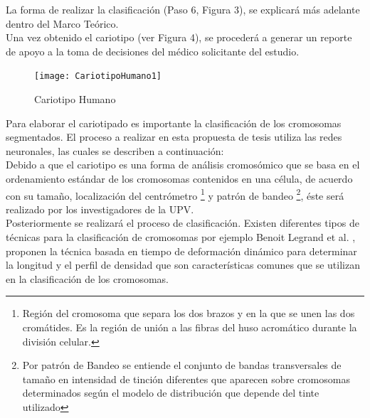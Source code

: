 \documentclass[12pt,letterpaper,titlepage]{article}
\begin{document}
\begin{itemize}
La forma de realizar la clasificación (Paso 6, Figura 3), se explicará más adelante dentro del Marco Teórico.\\


Una vez obtenido el cariotipo (ver Figura 4), se procederá a generar un reporte de apoyo a la toma de decisiones del médico solicitante del estudio.\\

\begin{figure}
  \centering
    \texttt{[image: CariotipoHumano1]}
  \caption{Cariotipo Humano}
  \label{fig5:CariotipoHumano}
\end{figure}


Para elaborar el cariotipado es importante la clasificación de los cromosomas segmentados. El proceso a realizar en esta propuesta de tesis utiliza las redes neuronales, las cuales se describen a continuación:\\

Debido a que el cariotipo es una forma de análisis cromosómico que se basa en el ordenamiento estándar de los cromosomas contenidos en una célula, de acuerdo con su tamaño, localización del centrómetro \footnote{Región del cromosoma que separa los dos brazos y en la que se unen las dos cromátides. Es la región de unión a las fibras del huso acromático durante la división celular.} y patrón de bandeo \footnote{Por patrón de Bandeo se entiende el conjunto de bandas transversales de tamaño en intensidad de tinción diferentes que aparecen sobre cromosomas determinados según el modelo de distribución que depende del tinte utilizado}, éste será realizado por los investigadores de la UPV.\\

Posteriormente se realizará el proceso de clasificación. Existen diferentes tipos de técnicas para la clasificación de cromosomas por ejemplo Benoit Legrand et al. \cite{132}, proponen la técnica basada en tiempo de deformación dinámico para determinar la longitud y el perfil de densidad que son características comunes que se utilizan en la clasificación de los cromosomas.\\


\end{itemize}
\end{document}
